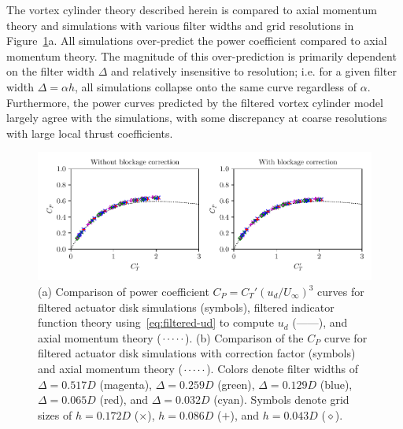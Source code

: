 \documentclass{article}
\newcommand{\dotted}{\protect\mbox{${\mathinner{\cdotp\cdotp\cdotp\cdotp\cdotp}}$}}
\newcommand{\full}{\protect\mbox{------}}
\begin{document}
The vortex cylinder theory described herein is compared to axial momentum theory and simulations with various filter widths and grid resolutions in Figure~\ref{fig}a. All simulations over-predict the power coefficient compared to axial momentum theory. The magnitude of this over-prediction is primarily dependent on the filter width $\Delta$ and relatively insensitive to resolution; i.e. for a given filter width $\Delta = \alpha h$, all simulations collapse onto the same curve regardless of $\alpha$. Furthermore, the power curves predicted by the filtered vortex cylinder model largely agree with the simulations, with some discrepancy at coarse resolutions with large local thrust coefficients. 

\begin{figure}[t]
\includegraphics{../fig/fig2.pdf}
\caption{(a) Comparison of power coefficient $C_P = C_T' (u_d/U_\infty)^3$ curves for filtered actuator disk simulations (symbols), filtered indicator function theory using~\eqref{eq:filtered-ud} to compute $u_d$ (\full), and axial momentum theory (\dotted). (b) Comparison of the $C_P$ curve for filtered actuator disk simulations with correction factor (symbols) and axial momentum theory (\dotted).  Colors denote filter widths of $\Delta = 0.517D$ (magenta), $\Delta = 0.259D$ (green), $\Delta = 0.129D$ (blue), $\Delta = 0.065D$ (red), and $\Delta = 0.032D$ (cyan). Symbols denote grid sizes of $h = 0.172D$ ($\times$), $h = 0.086D$ ($+$), and $h =  0.043D$ ($\diamond$). }
\label{fig}
\end{figure}
\end{document}
